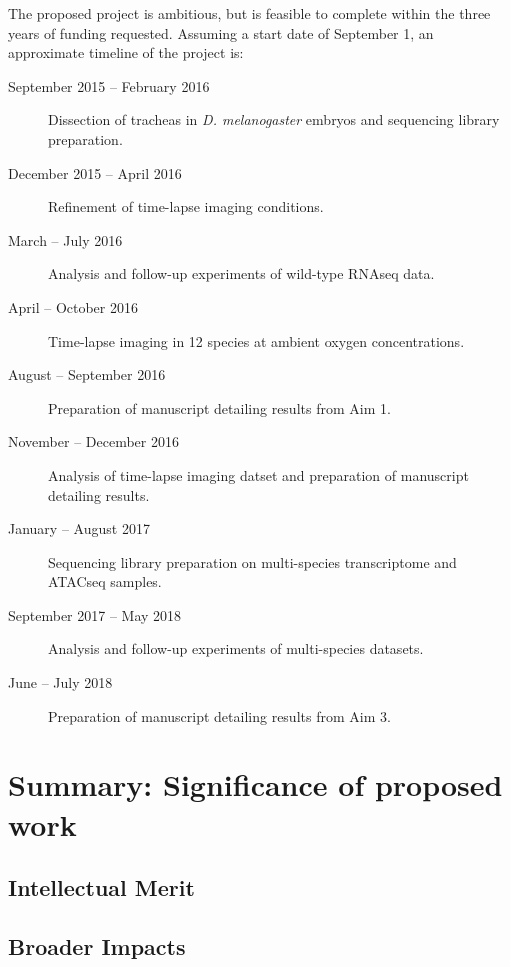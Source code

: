 \documentclass{proposal}
\begin{document}
The proposed project is ambitious, but is feasible to complete within the three years of funding requested.  Assuming a start date of September 1, an approximate timeline of the project is:

\begin{description}
\item[September 2015 -- February 2016] Dissection of tracheas in {\em D. melanogaster} embryos and sequencing library preparation.

\item[December 2015 -- April 2016] Refinement of time-lapse imaging conditions.

\item[March  -- July 2016] Analysis and follow-up experiments of wild-type RNAseq data.

\item[April -- October 2016] Time-lapse imaging in 12 species at ambient oxygen concentrations.

\item[August -- September 2016] Preparation of manuscript detailing results from Aim 1.

\item[November -- December 2016] Analysis of time-lapse imaging datset and preparation of manuscript detailing results.

\item[January -- August 2017] Sequencing library preparation on multi-species transcriptome and ATACseq samples.

\item[September 2017 -- May 2018] Analysis and follow-up experiments of multi-species datasets.

\item[June -- July 2018]  Preparation of manuscript detailing results from Aim 3.

\end{description}



\section{Summary:  Significance of proposed work}

\subsection{Intellectual Merit}

\subsection{Broader Impacts}




\newpage
{}
\renewcommand{\thepage} {E--\arabic{page}}



\end{document}
